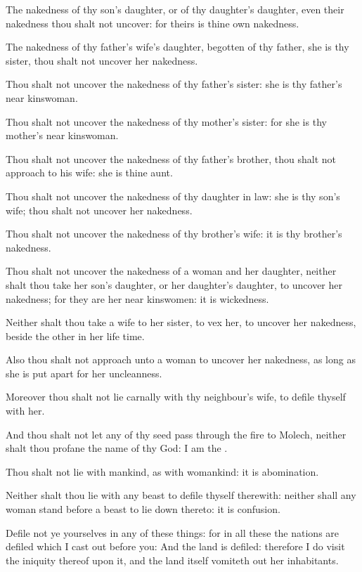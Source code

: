 \verse The nakedness of thy son's daughter, or of thy daughter's daughter, even their nakedness thou shalt not uncover: for theirs is thine own nakedness.

\verse The nakedness of thy father's wife's daughter, begotten of thy father, she is thy sister, thou shalt not uncover her nakedness.

\verse Thou shalt not uncover the nakedness of thy father's sister: she is thy father's near kinswoman.

\verse Thou shalt not uncover the nakedness of thy mother's sister: for she is thy mother's near kinswoman.

\verse Thou shalt not uncover the nakedness of thy father's brother, thou shalt not approach to his wife: she is thine aunt.

\verse Thou shalt not uncover the nakedness of thy daughter in law: she is thy son's wife; thou shalt not uncover her nakedness.

\verse Thou shalt not uncover the nakedness of thy brother's wife: it is thy brother's nakedness.

\verse Thou shalt not uncover the nakedness of a woman and her daughter, neither shalt thou take her son's daughter, or her daughter's daughter, to uncover her nakedness; for they are her near kinswomen: it is wickedness.

\verse Neither shalt thou take a wife to her sister, to vex her, to uncover her nakedness, beside the other in her life time.

\verse Also thou shalt not approach unto a woman to uncover her nakedness, as long as she is put apart for her uncleanness.

\verse Moreover thou shalt not lie carnally with thy neighbour's wife, to defile thyself with her.

\verse And thou shalt not let any of thy seed pass through the fire to Molech, neither shalt thou profane the name of thy God: I am the \LORD.

\verse Thou shalt not lie with mankind, as with womankind: it is abomination.

\verse Neither shalt thou lie with any beast to defile thyself therewith: neither shall any woman stand before a beast to lie down thereto: it is confusion.

\verse Defile not ye yourselves in any of these things: for in all these the nations are defiled which I cast out before you: \verse And the land is defiled: therefore I do visit the iniquity thereof upon it, and the land itself vomiteth out her inhabitants.

